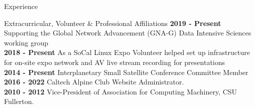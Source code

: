 \documentclass{resume} %
\begin{document}
\begin{rSection}{Experience}



\begin{rSection}{ Extracurricular, Volunteer \& Professional Affiliations}
	{\bf 2019 - Present} Supporting the Global Network Advancement (GNA-G) Data Intensive Sciences working group\\
{\bf 2018 - Present} As a SoCal Linux Expo Volunteer helped set up infrastructure for on-site expo network and A\/V live stream recording for presentations\\
{\bf 2014 - Present} Interplanetary Small Satellite Conference Committee Member\\
{\bf 2016 - 2022} Caltech Alpine Club Website Administrator. \\
{\bf 2010 - 2012} Vice-President of Association for Computing Machinery, CSU Fullerton. 
\end{rSection}







\end{rSection}
\end{document}
